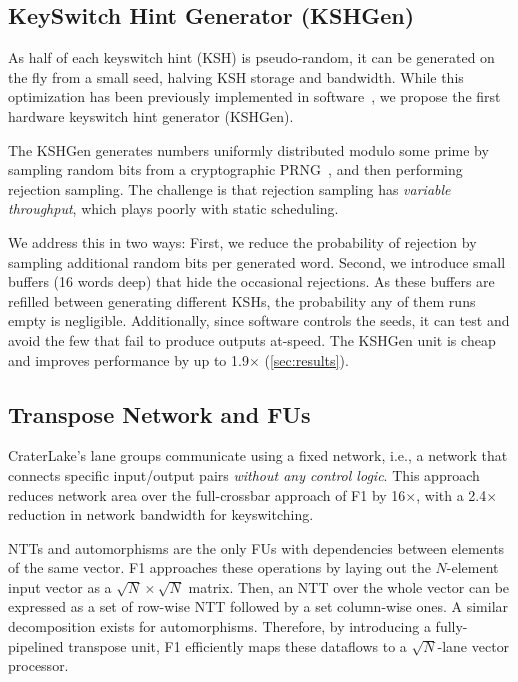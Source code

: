 \subsection{KeySwitch Hint Generator (KSHGen)}
\label{sec:prg}
As half of each keyswitch hint (KSH) is pseudo-random, it can be generated on
the fly from a small seed, halving KSH storage and bandwidth. While this
optimization has been previously implemented in
software~\cite{halevi:2020:design}, we propose the first hardware
keyswitch hint generator (KSHGen).

The KSHGen generates numbers uniformly distributed modulo some prime by
sampling random bits from a cryptographic
PRNG~\cite{bertoni:2018:kangarootwelve}, and then performing rejection
sampling. The challenge is that rejection sampling has \emph{variable
throughput}, which plays poorly with static scheduling.

We address this in two ways: First, we reduce the probability of rejection by
sampling additional random bits per generated word. Second, we introduce small
buffers (16 words deep) that hide the occasional rejections. As these buffers
are refilled between generating different KSHs, the probability any of them
runs empty is negligible. Additionally, since software controls the seeds, it
can test and avoid the few that fail to produce outputs at-speed.
%
The KSHGen unit is cheap and improves performance by up to 1.9$\times$
(\autoref{sec:results}).

\subsection{Transpose Network and FUs}\label{sec:network}

CraterLake's lane groups communicate using a fixed network, i.e., a network
that connects specific input/output pairs \emph{without any control logic}.
This approach reduces network area over the full-crossbar approach of F1 by
16$\times$, with a 2.4$\times$ reduction in network bandwidth for keyswitching.

NTTs and automorphisms are the only FUs with dependencies between elements of
the same vector. F1 approaches these operations by laying out the $N$-element
input vector as a $\sqrt N \times \sqrt N$ matrix. Then, an NTT over the whole
vector can be expressed as a set of row-wise NTT followed by a set column-wise
ones. A similar decomposition exists for automorphisms. Therefore, by
introducing a fully-pipelined transpose unit, F1 efficiently maps these
dataflows to a $\sqrt N$-lane vector processor.

